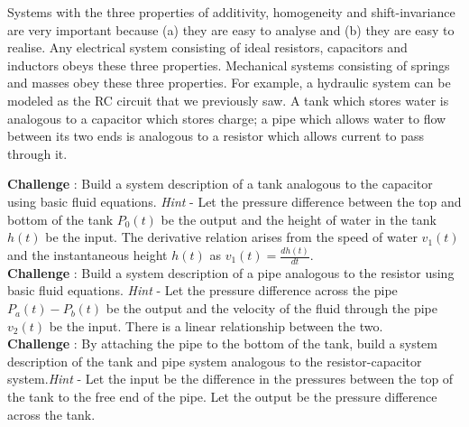 Systems with the three properties of additivity, homogeneity and shift-invariance are very important because (a) they are easy to analyse and (b) they are easy to realise. Any electrical system consisting of ideal resistors, capacitors and inductors obeys these three properties. Mechanical systems consisting of springs and masses obey these three properties. For example, a hydraulic system can be modeled as the RC circuit that we previously saw. A tank which stores water is analogous to a capacitor which stores charge; a pipe which allows water to flow between its two ends is analogous to a resistor which allows current to pass through it. 

\textbf{Challenge} : Build a system description of a tank analogous to the capacitor using basic fluid equations. 
\textit{Hint} - Let the pressure difference between the top and bottom of the tank $P_{0}(t)$ be the output and the height of water in the tank $h(t)$ be the input. The derivative relation arises from the speed of water $v_{1}(t)$ and the instantaneous height $h(t)$ as $v_{1}(t) = \frac{dh(t)}{dt}$.
\\

\textbf{Challenge} : Build a system description of a pipe analogous to the resistor using basic fluid equations.
\textit{Hint} - Let the pressure difference across the pipe $P_{a}(t) - P_{b}(t)$ be the output and the velocity of the fluid through the pipe $v_{2}(t)$ be the input. There is a linear relationship between the two.
\\

\textbf{Challenge} : By attaching the pipe to the bottom of the tank, build a system description of the tank and pipe system analogous to the resistor-capacitor system.\newline\textit{Hint} - Let the input be the difference in the pressures between the top of the tank to the free end of the pipe. Let the output be the pressure difference across the tank. 











